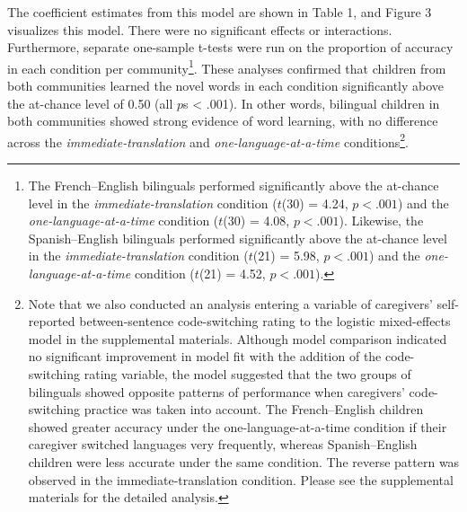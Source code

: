 \documentclass[
  man,floatsintext]{apa7}
\begin{document}
\noindent The coefficient estimates from this model are shown in Table 1, and Figure 3 visualizes this model. There were no significant effects or interactions. Furthermore, separate one-sample t-tests were run on the proportion of accuracy in each condition per community\footnote{The French--English bilinguals performed significantly above the at-chance level in the \emph{immediate-translation} condition (\(t\)(30) = 4.24, \(p < .001\)) and the \emph{one-language-at-a-time} condition (\(t\)(30) = 4.08, \(p < .001\)). Likewise, the Spanish--English bilinguals performed significantly above the at-chance level in the \emph{immediate-translation} condition (\(t\)(21) = 5.98, \(p < .001\)) and the \emph{one-language-at-a-time} condition (\(t\)(21) = 4.52, \(p < .001\)).}. These analyses confirmed that children from both communities learned the novel words in each condition significantly above the at-chance level of 0.50 (all \(p\)s \textless{} .001). In other words, bilingual children in both communities showed strong evidence of word learning, with no difference across the \emph{immediate-translation} and \emph{one-language-at-a-time} conditions\footnote{Note that we also conducted an analysis entering a variable of caregivers' self-reported between-sentence code-switching rating to the logistic mixed-effects model in the supplemental materials. Although model comparison indicated no significant improvement in model fit with the addition of the code-switching rating variable, the model suggested that the two groups of bilinguals showed opposite patterns of performance when caregivers' code-switching practice was taken into account. The French--English children showed greater accuracy under the one-language-at-a-time condition if their caregiver switched languages very frequently, whereas Spanish--English children were less accurate under the same condition. The reverse pattern was observed in the immediate-translation condition. Please see the supplemental materials for the detailed analysis.}.
\end{document}

